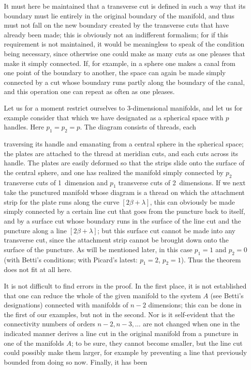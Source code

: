 \documentclass{article}
\begin{document}
It must here be maintained that a transverse cut is defined in such a way that its boundary must lie entirely in the original boundary of the manifold, and thus must not fall on the new boundary created by the transverse cuts that have already been made; this is obviously not an indifferent formalism; for if this requirement is not maintained, it would be meaningless to speak of the condition being necessary, since otherwise one could make as many cuts as one pleases that make it simply connected. If, for example, in a sphere one makes a canal from one point of the boundary to another, the space can again be made simply connected by a cut whose boundary runs partly along the boundary of the canal, and this operation one can repeat as often as one pleases.

Let us for a moment restrict ourselves to 3-dimensional manifolds, and let us for example consider that which we have designated as a spherical space with $p$ handles. Here $p_1 = p_2 = p$. The diagram consists of threads, each

traversing its handle and emanating from a central sphere in the spherical space; the plates are attached to the thread at meridian cuts, and each cuts across its handle. The plates are easily deformed so that the strips slide onto the surface of the central sphere, and one has realized the manifold simply connected by $p_2$ transverse cuts of 1~dimension and $p_1$ transverse cuts of 2~dimensions. If we next take the punctured manifold whose diagram is a thread on which the attachment strip for the plate runs along the curve $[2\beta + \lambda]$, this can obviously be made simply connected by a certain line cut that goes from the puncture back to itself, and by a surface cut whose boundary runs in the surface of the line cut and the puncture along a line $[2\beta + \lambda]$; but this surface cut cannot be made into any transverse cut, since the attachment strip cannot be brought down onto the surface of the puncture. As will be mentioned later, in this case $p_1 = 1$ and $p_2 = 0$ (with Betti's conditions; with Picard's latest: $p_1 = 2$, $p_2 = 1$). Thus the theorem does not fit at all here.

It is not difficult to find errors in the proof. In the first place, it is not established that one can reduce the whole of the given manifold to the system $A$ (see Betti's designations) connected with manifolds of $n - 2$ dimensions; this can be done in the first of our examples, but not in the second. Nor is it self-evident that the connectivity numbers of orders $n - 2, n - 3, \dots$ are not changed when one in the indicated manner derives a line cut in the original manifold from a puncture in one of the manifolds $A$; to be sure, they cannot become smaller, but the line cut could possibly make them larger, for example by preventing a line that previously bounded from doing so now. Finally, it has been
\end{document}
